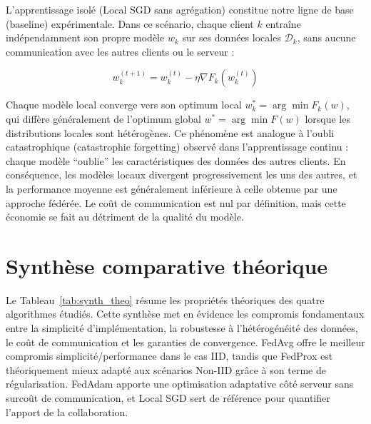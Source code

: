 \documentclass[12pt,a4paper]{report}
\begin{document}
L'apprentissage isol\'{e} (Local SGD sans agr\'{e}gation) constitue notre ligne de base (baseline) exp\'{e}rimentale. Dans ce sc\'{e}nario, chaque client $k$ entra\^{i}ne ind\'{e}pendamment son propre mod\`{e}le $w_k$ sur ses donn\'{e}es locales $\mathcal{D}_k$, sans aucune communication avec les autres clients ou le serveur :

\begin{equation}
w_k^{(t+1)} = w_k^{(t)} - \eta \nabla F_k(w_k^{(t)})
\label{eq:local_sgd}
\end{equation}

Chaque mod\`{e}le local converge vers son optimum local $w_k^* = \arg\min F_k(w)$, qui diff\`{e}re g\'{e}n\'{e}ralement de l'optimum global $w^* = \arg\min F(w)$ lorsque les distributions locales sont h\'{e}t\'{e}rog\`{e}nes. Ce ph\'{e}nom\`{e}ne est analogue \`{a} l'oubli catastrophique (catastrophic forgetting) observ\'{e} dans l'apprentissage continu : chaque mod\`{e}le ``oublie'' les caract\'{e}ristiques des donn\'{e}es des autres clients. En cons\'{e}quence, les mod\`{e}les locaux divergent progressivement les uns des autres, et la performance moyenne est g\'{e}n\'{e}ralement inf\'{e}rieure \`{a} celle obtenue par une approche f\'{e}d\'{e}r\'{e}e. Le co\^{u}t de communication est nul par d\'{e}finition, mais cette \'{e}conomie se fait au d\'{e}triment de la qualit\'{e} du mod\`{e}le.

\section{Synth\`{e}se comparative th\'{e}orique}

Le Tableau~\ref{tab:synth_theo} r\'{e}sume les propri\'{e}t\'{e}s th\'{e}oriques des quatre algorithmes \'{e}tudi\'{e}s. Cette synth\`{e}se met en \'{e}vidence les compromis fondamentaux entre la simplicit\'{e} d'impl\'{e}mentation, la robustesse \`{a} l'h\'{e}t\'{e}rog\'{e}n\'{e}it\'{e} des donn\'{e}es, le co\^{u}t de communication et les garanties de convergence. FedAvg offre le meilleur compromis simplicit\'{e}/performance dans le cas IID, tandis que FedProx est th\'{e}oriquement mieux adapt\'{e} aux sc\'{e}narios Non-IID gr\^{a}ce \`{a} son terme de r\'{e}gularisation. FedAdam apporte une optimisation adaptative c\^{o}t\'{e} serveur sans surco\^{u}t de communication, et Local SGD sert de r\'{e}f\'{e}rence pour quantifier l'apport de la collaboration.
\end{document}
